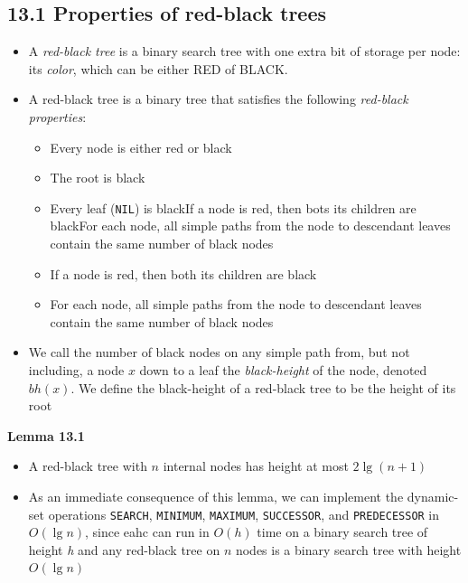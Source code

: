 \documentclass{report}
\begin{document}
\subsection*{13.1 Properties of red-black trees}
\begin{itemize}
    \item A \textit{red-black tree} is a binary search tree with one extra bit of storage per node: its \textit{color}, which can be either RED of BLACK.
    \item A red-black tree is a binary tree that satisfies the following \textit{red-black properties}:
    \begin{itemize}
        \item Every node is either red or black
        \item The root is black
        \item Every leaf (\texttt{NIL}) is blackIf a node is red, then bots its children are blackFor each node, all simple paths from the node to descendant leaves contain the same number of black nodes
        \item If a node is red, then both its children are black
        \item For each node, all simple paths from the node to descendant leaves contain the same number of black nodes
    \end{itemize}
    \item We call the number of black nodes on any simple path from, but not including, a node $x$ down to a leaf the \textit{black-height} of the node, denoted $bh(x)$. We define the black-height of a red-black tree to be the height of its root
\end{itemize}
\textbf{Lemma 13.1}
\begin{itemize}
    \item A red-black tree with $n$ internal nodes has height at most $2 \lg(n + 1)$
    \item As an immediate consequence of this lemma, we can implement the dynamic-set operations \texttt{SEARCH}, \texttt{MINIMUM}, \texttt{MAXIMUM}, \texttt{SUCCESSOR}, and \texttt{PREDECESSOR} in $O(\lg n)$, since eahc can run in $O(h)$ time on a binary search tree of height \textit{h} and any red-black tree on $n$ nodes is a binary search tree with height $O(\lg n)$ 
\end{itemize}
\end{document}
